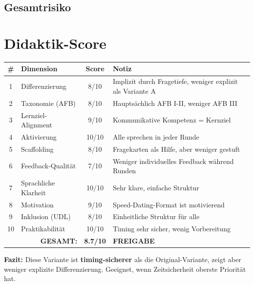 \documentclass[11pt, a4paper]{article}
\begin{document}
\subsection{Gesamtrisiko}

\begin{center}
\end{center}


\section{Didaktik-Score}

\begin{center}
\begin{tabular}{|c|l|c|p{5cm}|}
    \hline
    \textbf{\#} & \textbf{Dimension} & \textbf{Score} & \textbf{Notiz} \\
    \hline
    1 & Differenzierung & 8/10 & Implizit durch Fragetiefe, weniger explizit als Variante A \\
    \hline
    2 & Taxonomie (AFB) & 8/10 & Hauptsächlich AFB I-II, weniger AFB III \\
    \hline
    3 & Lernziel-Alignment & 9/10 & Kommunikative Kompetenz = Kernziel \\
    \hline
    4 & Aktivierung & 10/10 & Alle sprechen in jeder Runde \\
    \hline
    5 & Scaffolding & 8/10 & Fragekarten als Hilfe, aber weniger gestuft \\
    \hline
    6 & Feedback-Qualität & 7/10 & Weniger individuelles Feedback während Runden \\
    \hline
    7 & Sprachliche Klarheit & 10/10 & Sehr klare, einfache Struktur \\
    \hline
    8 & Motivation & 9/10 & Speed-Dating-Format ist motivierend \\
    \hline
    9 & Inklusion (UDL) & 8/10 & Einheitliche Struktur für alle \\
    \hline
    10 & Praktikabilität & 10/10 & Timing sehr sicher, wenig Vorbereitung \\
    \hline
    \multicolumn{2}{|r|}{\textbf{GESAMT:}} & \textbf{8.7/10} & \textcolor{success}{\textbf{FREIGABE}} \\
    \hline
\end{tabular}
\end{center}

\vspace{0.5cm}

\textbf{Fazit:} Diese Variante ist \textbf{timing-sicherer} als die Original-Variante, zeigt aber weniger explizite Differenzierung. Geeignet, wenn Zeitsicherheit oberste Priorität hat.
\end{document}
